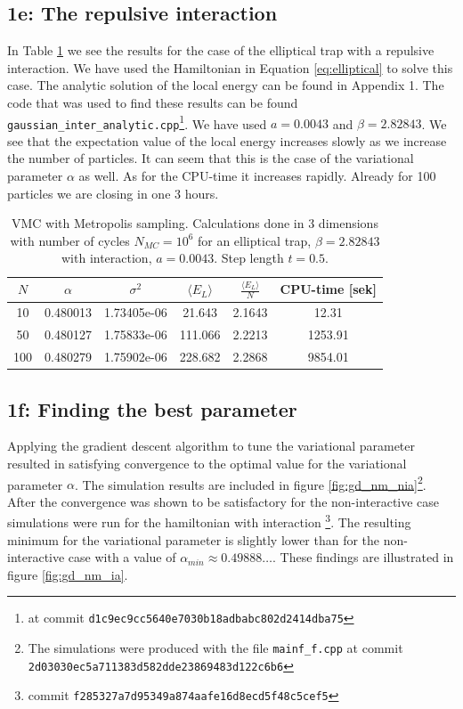 \subsection*{\textbf{1e:} The repulsive interaction}


In Table \ref{tab:Re.int.} we see the results for the case of the elliptical trap with a repulsive interaction. We have used the Hamiltonian in Equation \ref{eq:elliptical} to solve this case. The analytic solution of the local energy can be found in Appendix 1. The code that was used to find these results can be found \lstinline{gaussian_inter_analytic.cpp}\footnote{at commit \lstinline{d1c9ec9cc5640e7030b18adbabc802d2414dba75}}.
We have used $a = 0.0043$ and $\beta = 2.82843$. We see that the expectation value of the local energy increases slowly as we increase the number of particles. It can seem that this is the case of the variational parameter $\alpha$ as well. 
As for the CPU-time it increases rapidly. Already for 100 particles we are closing in one 3 hours.


\begin{table}[]
    \centering
    \begin{tabular}{|c|c|c|c|c|c|}
    \hline
         $N$ & $\alpha$ & $\sigma^2$ & $\langle E_L \rangle$ & $\frac{\langle E_L \rangle}{N}$ & CPU-time [sek] \\
         \hline
         10 & 0.480013 & 1.73405e-06 & 21.643 & 2.1643 & 12.31 \\
         \hline
         50 & 0.480127 & 1.75833e-06 & 111.066 & 2.2213 & 1253.91\\
         \hline
         100 & 0.480279 & 1.75902e-06 & 228.682 & 2.2868 & 9854.01 \\
         \hline
    \end{tabular}
    \caption{VMC with Metropolis sampling. Calculations done in 3 dimensions with number of cycles $N_{MC} = 10^{6}$ for an elliptical trap, $\beta = 2.82843$ with interaction, $a = 0.0043$. Step length $t = 0.5$.}
    \label{tab:Re.int.}
\end{table}


\subsection*{\textbf{1f:} Finding the best parameter}
Applying the gradient descent algorithm to tune the variational parameter resulted in satisfying convergence to the optimal value for the variational parameter $\alpha$. The simulation results are included in figure \ref{fig:gd_nm_nia}\footnote{The simulations were produced with the file \lstinline{mainf_f.cpp} at commit \lstinline{2d03030ec5a711383d582dde23869483d122c6b6}}. After the convergence was shown to be satisfactory for the non-interactive case simulations were run for the hamiltonian with interaction \footnote{commit \lstinline{f285327a7d95349a874aafe16d8ecd5f48c5cef5}}. The resulting minimum for the variational parameter is slightly lower than for the non-interactive case with a value of $\alpha_{min} \approx 0.49888\ldots$. These findings are illustrated in figure \ref{fig:gd_nm_ia}. 


